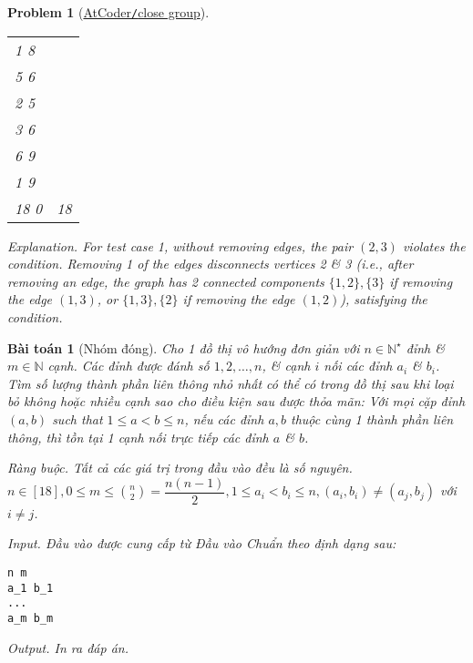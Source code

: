 \documentclass{article}
\newtheorem{baitoan}{Bài toán}
\newtheorem{problem}{Problem}
\begin{document}
\begin{problem}[\href{https://atcoder.jp/contests/abc187/tasks/abc187_f}{AtCoder{\tt/}close group}]
\begin{table}[H]
\begin{tabular}{|l|l|}
            1 8 & \\
            5 6 & \\
            2 5 & \\
            3 6 & \\
            6 9 & \\
            1 9 & \\
            \hline
            18 0 & 18 \\
            \hline
        \end{tabular}
    \end{table}
    \item {\sf Explanation.} For test case 1, without removing edges, the pair $(2,3)$ violates the condition. Removing 1 of the edges disconnects vertices 2 \& 3 (i.e., after removing an edge, the graph has 2 connected components $\{1,2\},\{3\}$ if removing the edge $(1,3)$, or $\{1,3\},\{2\}$ if removing the edge $(1,2)$), satisfying the condition.
\end{problem}

\begin{baitoan}[Nhóm đóng]
    Cho 1 đồ thị vô hướng đơn giản với $n\in\mathbb{N}^\star$ đỉnh \& $m\in\mathbb{N}$ cạnh. Các đỉnh được đánh số $1, 2, \ldots, n$, \& cạnh $i$ nối các đỉnh $a_i$ \& $b_i$. Tìm số lượng thành phần liên thông nhỏ nhất có thể có trong đồ thị sau khi loại bỏ không hoặc nhiều cạnh sao cho điều kiện sau được thỏa mãn: Với mọi cặp đỉnh $(a,b)$ such that $1\le a < b \le n$, nếu các đỉnh $a,b$ thuộc cùng 1 thành phần liên thông, thì tồn tại 1 cạnh nối trực tiếp các đỉnh $a$ \& $b$.
    \item {\sf Ràng buộc.} Tất cả các giá trị trong đầu vào đều là số nguyên. $n\in[18],0\le m\le\binom{n}{2} =\dfrac{n(n - 1)}{2},1\le a_i < b_i\le n,(a_i,b_i)\ne(a_j,b_j)$ với $i\ne j$.
    \item {\sf Input.} Đầu vào được cung cấp từ Đầu vào Chuẩn theo định dạng sau:
    \begin{verbatim}
n m
a_1 b_1
...
a_m b_m
    \end{verbatim}
    \item {\sf Output.} In ra đáp án.
\end{baitoan}
\end{document}
